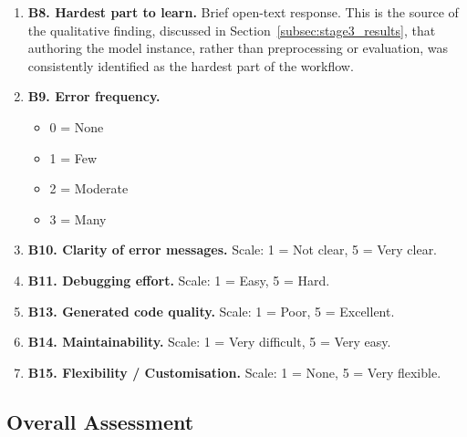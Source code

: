 \begin{enumerate}[leftmargin=*]
    \item \textbf{B8. Hardest part to learn.}
    Brief open-text response. This is the source of the qualitative finding, discussed in Section~\ref{subsec:stage3_results}, that authoring the model instance, rather than preprocessing or evaluation, was consistently identified as the hardest part of the workflow.

    \item \textbf{B9. Error frequency.}
    \begin{itemize}
        \item 0 = None
        \item 1 = Few
        \item 2 = Moderate
        \item 3 = Many
    \end{itemize}

    \item \textbf{B10. Clarity of error messages.}
    Scale: 1 = Not clear, 5 = Very clear.

    \item \textbf{B11. Debugging effort.}
    Scale: 1 = Easy, 5 = Hard.

    \item \textbf{B13. Generated code quality.}
    Scale: 1 = Poor, 5 = Excellent.

    \item \textbf{B14. Maintainability.}
    Scale: 1 = Very difficult, 5 = Very easy.

    \item \textbf{B15. Flexibility / Customisation.}
    Scale: 1 = None, 5 = Very flexible.
\end{enumerate}

\subsection{Overall Assessment}
\label{app:stage3_overall_questions}

